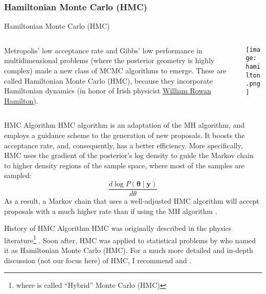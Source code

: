 \subsubsection{Hamiltonian Monte Carlo (HMC)}
\begin{frame}{Hamiltonian Monte Carlo (HMC)}
	\begin{columns}
		\begin{column}{0.8\textwidth}
			Metropolis' low acceptance rate and Gibbs' low performance in multidimensional problems
			(where the posterior geometry is highly complex)
			made a new class of MCMC algorithms to emerge.
			These are called Hamiltonian Monte Carlo (HMC),
			because they incorporate Hamiltonian dynamics
			(in honor of Irish physicist
			\href{https://en.wikipedia.org/wiki/William_Rowan_Hamilton}{William Rowan Hamilton}).
		\end{column}
		\begin{column}{0.2\textwidth}
			\texttt{[image: hamilton.png]}
		\end{column}
	\end{columns}
\end{frame}

\begin{frame}{HMC Algorithm}
	HMC algorithm is an adaptation of the MH algorithm,
	and employs a guidance scheme to the generation of new proposals.
	It boosts the acceptance rate, and, consequently, has a better efficiency.
	\vfill
	More specifically, HMC uses the gradient of the posterior's log density
	to guide the Markov chain to higher density regions of the sample space,
	where most of the samples are sampled:
	$$
		\frac{d \log P(\boldsymbol{\theta} \mid \mathbf{y})}{d \theta}
	$$
	As a result, a Markov chain that uses a well-adjusted HMC algorithm will accept
	proposals with a much higher rate than if using the MH algorithm
	\parencite{robertsWeakConvergenceOptimal1997, beskosOptimalTuningHybrid2013}.
\end{frame}

\begin{frame}{History of HMC Algorithm}
	HMC was originally described in the physics literature\footnote{where is called ``Hybrid'' Monte Carlo (HMC)}
	\parencite{duaneHybridMonteCarlo1987}.
	\vfill
	Soon after, HMC was applied to statistical problems by
	\textcite{nealImprovedAcceptanceProcedure1994} who named it as Hamiltonian Monte Carlo (HMC).
	\vfill
	For a much more detailed and in-depth discussion (not our focus here) of HMC,
	I recommend
	\textcite{neal2011mcmc} and \textcite{betancourtConceptualIntroductionHamiltonian2017}.
\end{frame}

